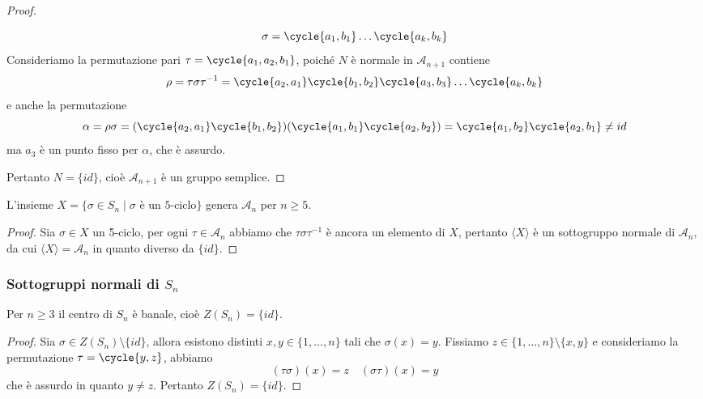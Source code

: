 \documentclass[11pt]{scrartcl}
\begin{document}
\begin{proof}
\begin{itemize}
        \[
            \sigma = \cycle{a_1, b_1}\ldots\cycle{a_k, b_k}
        \]
        Consideriamo la permutazione pari $\tau = \cycle{a_1, a_2, b_1}$,
        poiché $N$ è normale in $\mathcal{A}_{n + 1}$ contiene
        \[
            \rho = \tau\sigma\tau^{-1} = \cycle{a_2, a_1}\cycle{b_1, b_2}
            \cycle{a_3, b_3}\ldots\cycle{a_k, b_k}
        \]
        e anche la permutazione 
        \[
            \alpha = \rho\sigma = (\cycle{a_2, a_1}\cycle{b_1, b_2})
            (\cycle{a_1, b_1}\cycle{a_2, b_2}) = \cycle{a_1, b_2}\cycle{a_2, b_1} \neq id
        \]
        ma $a_3$ è un punto fisso per $\alpha$, che è assurdo.
    \end{itemize}
    Pertanto $N = \{id\}$, cioè $\mathcal{A}_{n + 1}$ è un gruppo semplice.
\end{proof}

\begin{corollary}
    L'insieme $X = \{\sigma \in S_n\mid \sigma \text{ è un 5-ciclo}\}$ genera
    $\mathcal{A}_n$ per $n \geqslant 5$.
\end{corollary}

\begin{proof}
    Sia $\sigma \in X$ un 5-ciclo, per ogni $\tau \in \mathcal{A}_n$
    abbiamo che $\tau\sigma\tau^{-1}$ è ancora un elemento di $X$, pertanto
    $\langle X\rangle$ è un sottogruppo normale di $\mathcal{A}_n$, da cui 
    $\langle X \rangle = \mathcal{A}_n$ in quanto diverso da $\{id\}$.
\end{proof}


\subsubsection{Sottogruppi normali di $S_n$}

\begin{lemma}
    \label{lemma1.65}
    Per $n \geq 3$ il centro di $S_n$ è banale, cioè $Z(S_n) = \{id\}$.
\end{lemma}

\begin{proof}
    Sia $\sigma \in Z(S_n) \setminus \{id\}$, allora esistono distinti 
    $x, y \in \{1, \ldots, n\}$ tali che $\sigma(x) = y$. Fissiamo 
    $z \in \{1, \ldots, n\}\setminus \{x, y\}$ e consideriamo la permutazione
    $\tau = \cycle{y, z}$, abbiamo
    \[
        (\tau\sigma)(x) = z \quad (\sigma\tau)(x) = y
    \]
    che è assurdo in quanto $y \neq z$. Pertanto $Z(S_n) = \{id\}$.
\end{proof}
\end{document}
